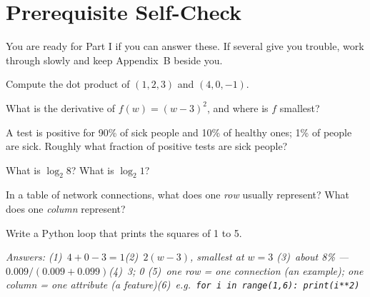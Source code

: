 \section*{Prerequisite Self-Check}

You are ready for Part I if you can answer these. If several give you trouble,
work through  slowly and keep Appendix~B beside you.

\begin{tightnum}
  \item Compute the dot product of $(1, 2, 3)$ and $(4, 0, -1)$.
  \item What is the derivative of $f(w) = (w - 3)^2$, and where is $f$ smallest?
  \item A test is positive for 90\% of sick people and 10\% of healthy ones; 1\%
        of people are sick. Roughly what fraction of positive tests are sick
        people?
  \item What is $\log_2 8$? What is $\log_2 1$?
  \item In a table of network connections, what does one \emph{row} usually
        represent? What does one \emph{column} represent?
  \item Write a Python loop that prints the squares of 1 to 5.
\end{tightnum}

\smallskip
\textit{Answers: (1)~$4+0-3=1$\quad (2)~$2(w-3)$, smallest at $w=3$\quad
(3)~about 8\% --- $0.009/(0.009+0.099)$\quad (4)~3; 0\quad
(5)~one row = one connection (an example); one column = one attribute (a
feature)\quad (6)~e.g.\ \texttt{for i in range(1,6): print(i**2)}}

\newpage
\tableofcontents
\newpage
\listoffigures
{}
\newpage

\setcounter{page}{1}
